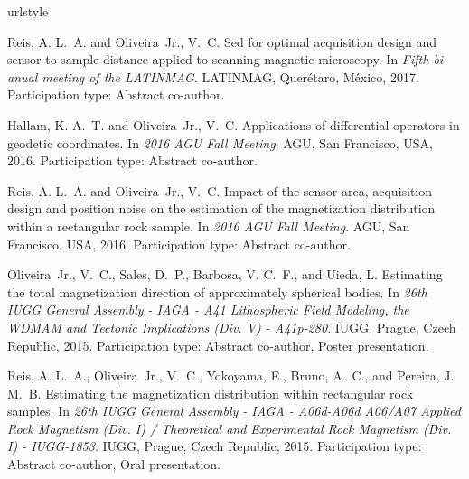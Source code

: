 
\nocite{*}

%
\begin{thebibliography}{10}
\providecommand{\natexlab}[1]{#1}
\expandafter\ifx\csname urlstyle\endcsname\relax
  \providecommand{\doi}[1]{doi:\discretionary{}{}{}#1}\else
  \providecommand{\doi}{doi:\discretionary{}{}{}\begingroup
  \urlstyle{rm}\Url}\fi

Reis, A. L.~A. and Oliveira~Jr., V.~C.
\newblock Sed for optimal acquisition design and sensor-to-sample distance
  applied to scanning magnetic microscopy.
\newblock In \emph{Fifth bi-anual meeting of the LATINMAG}. LATINMAG,
  Quer\'{e}taro, M\'{e}xico, 2017.
\newblock Participation type: Abstract co-author.

Hallam, K. A.~T. and Oliveira~Jr., V.~C.
\newblock Applications of differential operators in geodetic coordinates.
\newblock In \emph{2016 AGU Fall Meeting}. AGU, San Francisco, USA, 2016.
\newblock Participation type: Abstract co-author.

Reis, A. L.~A. and Oliveira~Jr., V.~C.
\newblock Impact of the sensor area, acquisition design and position noise on
  the estimation of the magnetization distribution within a rectangular rock
  sample.
\newblock In \emph{2016 AGU Fall Meeting}. AGU, San Francisco, USA, 2016.
\newblock Participation type: Abstract co-author.

Oliveira~Jr., V.~C., Sales, D.~P., Barbosa, V. C.~F., and Uieda, L.
\newblock Estimating the total magnetization direction of approximately
  spherical bodies.
\newblock In \emph{26th IUGG General Assembly - IAGA - A41 Lithospheric Field
  Modeling, the WDMAM and Tectonic Implications (Div. V) - A41p-280}. IUGG,
  Prague, Czech Republic, 2015.
\newblock Participation type: Abstract co-author, Poster presentation.

Reis, A. L.~A., Oliveira~Jr., V.~C., Yokoyama, E., Bruno, A.~C., and Pereira,
  J. M.~B.
\newblock Estimating the magnetization distribution within rectangular rock
  samples.
\newblock In \emph{26th IUGG General Assembly - IAGA - A06d-A06d A06/A07
  Applied Rock Magnetism (Div. I) / Theoretical and Experimental Rock Magnetism
  (Div. I) - IUGG-1853}. IUGG, Prague, Czech Republic, 2015.
\newblock Participation type: Abstract co-author, Oral presentation.


\end{thebibliography}
